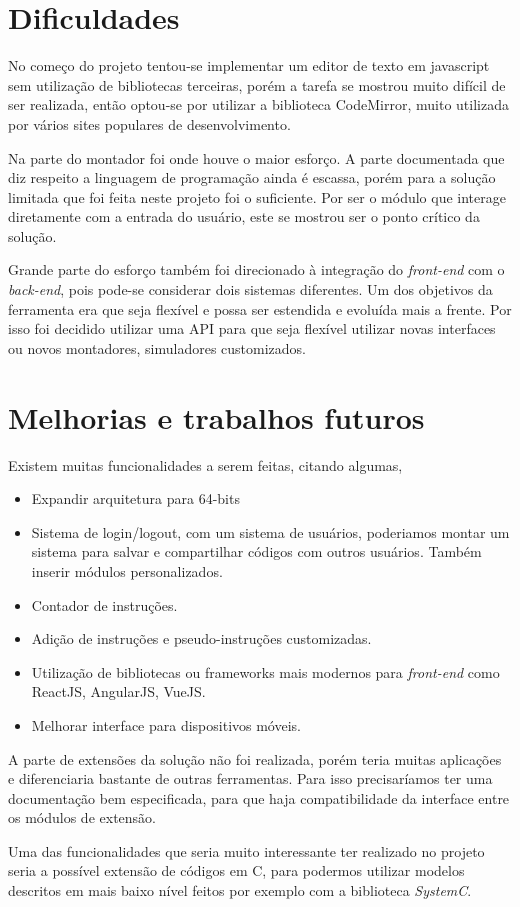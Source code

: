 \section{Dificuldades}

	No começo do projeto tentou-se implementar um editor de texto em javascript sem utilização de bibliotecas terceiras, porém a tarefa se mostrou muito difícil de ser realizada, então optou-se por utilizar a biblioteca CodeMirror, muito utilizada por vários sites populares de desenvolvimento.

	Na parte do montador foi onde houve o maior esforço. A parte documentada que diz respeito a linguagem de programação ainda é escassa, porém para a solução limitada que foi feita neste projeto foi o suficiente. Por ser o módulo que interage diretamente com a entrada do usuário, este se mostrou ser o ponto crítico da solução.

	Grande parte do esforço também foi direcionado à integração do \textit{front-end} com o \textit{back-end}, pois pode-se considerar dois sistemas diferentes. Um dos objetivos da ferramenta era que seja flexível e possa ser estendida e evoluída mais a frente. Por isso foi decidido utilizar uma API para que seja flexível utilizar novas interfaces ou novos montadores, simuladores customizados.

\section{Melhorias e trabalhos futuros}

	Existem muitas funcionalidades a serem feitas, citando algumas,

	\begin{itemize}
		\item Expandir arquitetura para 64-bits
		\item Sistema de login/logout, com um sistema de usuários, poderiamos montar um sistema para salvar e compartilhar códigos com outros usuários. Também inserir módulos personalizados.
		\item Contador de instruções.
		\item Adição de instruções e pseudo-instruções customizadas.
		\item Utilização de bibliotecas ou frameworks mais modernos para \textit{front-end} como ReactJS, AngularJS, VueJS.
		\item Melhorar interface para dispositivos móveis.		
	\end{itemize}

	A parte de extensões da solução não foi realizada, porém teria muitas aplicações e diferenciaria bastante de outras ferramentas. Para isso precisaríamos ter uma documentação bem especificada, para que haja compatibilidade da interface entre os módulos de extensão.

	Uma das funcionalidades que seria muito interessante ter realizado no projeto seria a possível extensão de códigos em C, para podermos utilizar modelos descritos em mais baixo nível feitos por exemplo com a biblioteca \textit{SystemC}.